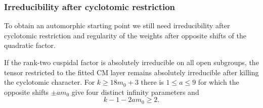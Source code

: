 \subsubsection{Irreducibility after cyclotomic restriction}

To obtain an automorphic starting point we still need irreducibility after cyclotomic restriction and regularity of the weights after opposite shifts of the quadratic factor.

\begin{proposition}\label{prop:count-three-tensor-irreducible}
If the rank-two cuspidal factor is absolutely irreducible on all
open subgroups, the tensor restricted to the fitted CM layer
remains absolutely irreducible after killing the cyclotomic
character. For \(k\ge18m_0+3\) there is \(1\le a\le9\) for which the
opposite shifts \(\pm am_0\) give four distinct infinity parameters
and 
\[
 k-1-2am_0\ge2.
\]

\end{proposition}

